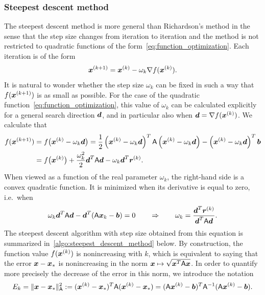\subsubsection{Steepest descent method}%
\label{ssub:steepest_descent_method}

The steepest descent method is more general than Richardson's method in the sense that
the step size changes from iteration to iteration
and the method is not restricted to quadratic functions of the form~\eqref{eq:function_optimization}.
Each iteration is of the form
\[
    \mathbf{\boldsymbol{x}}^{(k+1)} = \mathbf{\boldsymbol{x}}^{(k)} - \omega_k \nabla f(\mathbf{\boldsymbol{x}}^{(k)}).
\]
It is natural to wonder whether the step size $\omega_k$ can be fixed in such a way that
$f(\mathbf{\boldsymbol{x}}^{(k+1)})$ is as small as possible.
For the case of the quadratic function~\eqref{eq:function_optimization},
this value of $\omega_k$ can be calculated explicitly for a general search direction $\mathbf{\boldsymbol{d}}$,
and in particular also when $\mathbf{\boldsymbol{d}} = \nabla f(\mathbf{\boldsymbol{x}}^{(k)})$.
We calculate that
\begin{align}
    \notag
    f(\mathbf{\boldsymbol{x}}^{(k+1)})
    &= f\bigl(\mathbf{\boldsymbol{x}}^{(k)} - \omega_k \mathbf{\boldsymbol{d}}\bigr) = \frac{1}{2} \left( \mathbf{\boldsymbol{x}}^{(k)} - \omega_k \mathbf{\boldsymbol{d}}\right)^T \mathsf A \left(\mathbf{\boldsymbol{x}}^{(k)} - \omega_k \mathbf{\boldsymbol{d}}\right) - \left(\mathbf{\boldsymbol{x}}^{(k)} - \omega_k \mathbf{\boldsymbol{d}}\right)^T \mathbf{\boldsymbol{b}} \\
    \label{eq:linear_steepest}
    &= f\bigl( \mathbf{\boldsymbol{x}}^{(k)} \bigr) + \frac{\omega_k^2}{2} \mathbf{\boldsymbol{d}}^T \mathsf A \mathbf{\boldsymbol{d}} - \omega_k \mathbf{\boldsymbol{d}}^T \mathbf{\boldsymbol{r}}^{(k)}.
\end{align}
When viewed as a function of the real parameter $\omega_k$,
the right-hand side is a convex quadratic function.
It is minimized when its derivative is equal to zero,
i.e.\ when
\begin{equation}
    \label{eq:linear_optimal_step_size_steepest_descent}
    \omega_k \mathbf{\boldsymbol{d}}^T \mathsf A \mathbf{\boldsymbol{d}} - \mathbf{\boldsymbol{d}}^T (\mathsf A \mathbf{\boldsymbol{x}}_k - \mathbf{\boldsymbol{b}}) = 0
    \qquad \Rightarrow  \qquad \omega_k = \frac{\mathbf{\boldsymbol{d}}^T \mathbf{\boldsymbol{r}}^{(k)}}{\mathbf{\boldsymbol{d}}^T \mathsf A \mathbf{\boldsymbol{d}}}.
\end{equation}
The steepest descent algorithm with step size obtained from this equation is summarized in~\cref{algo:steepest_descent_method} below.
By construction,
the function value $f(\mathbf{\boldsymbol{x}}^{(k)})$ is nonincreasing with $k$,
which is equivalent to saying that
the error $\mathbf{\boldsymbol{x}} - \mathbf{\boldsymbol{x}}_*$ is nonincreasing in the norm $\mathbf{\boldsymbol{x}} \mapsto \sqrt{\mathbf{\boldsymbol{x}}^T \mathsf A \mathbf{\boldsymbol{x}}}$.
In order to quantify more precisely the decrease of the error in this norm,
we introduce the notation
\[
    E_k = \lVert\mathbf{\boldsymbol{x}} - \mathbf{\boldsymbol{x}}_*\rVert^2_{\mathsf A} := (\mathbf{\boldsymbol{x}}^{(k)} - \mathbf{\boldsymbol{x}}_*)^T \mathsf A (\mathbf{\boldsymbol{x}}^{(k)} - \mathbf{\boldsymbol{x}}_*)
    = (\mathsf A \mathbf{\boldsymbol{x}}^{(k)} - \mathbf{\boldsymbol{b}})^T \mathsf A^{-1} (\mathsf A \mathbf{\boldsymbol{x}}^{(k)} - \mathbf{\boldsymbol{b}}).
\]

